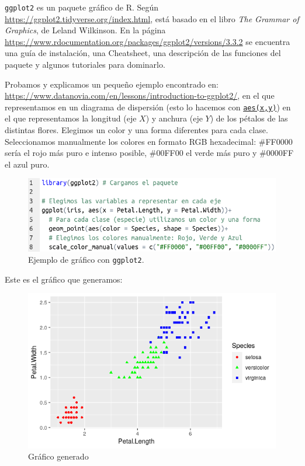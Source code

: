 \documentclass[12pt]{article}
\begin{document}
\texttt{ggplot2} es un paquete gráfico de R. Según
\href{https://ggplot2.tidyverse.org/index.html}{https://ggplot2.tidyverse.org/index.html},
está basado en el libro \emph{The Grammar of Graphics}, de Leland
Wilkinson. En la página \\
\href{https://www.rdocumentation.org/packages/ggplot2/versions/3.3.2}{https://www.rdocumentation.org/packages/ggplot2/versions/3.3.2}
se encuentra una guía de instalación, una Cheatsheet, una descripción
de las funciones del paquete y algunos tutoriales para dominarlo.

Probamos y explicamos un pequeño ejemplo encontrado en: \\
\href{https://www.datanovia.com/en/lessons/introduction-to-ggplot2/}{https://www.datanovia.com/en/lessons/introduction-to-ggplot2/},
en el que representamos en un diagrama de dispersión (esto lo hacemos
con
\href{https://www.rdocumentation.org/packages/ggplot2/versions/3.3.2/topics/aes}{\texttt{aes(x,y)}})
en el que representamos la longitud (eje $X$) y anchura (eje $Y$) de
los pétalos de las distintas flores. Elegimos un color y una forma
diferentes para cada clase. Seleccionamos manualmente los colores en
formato RGB hexadecimal: \#FF0000 sería el rojo más puro e intenso
posible, \#00FF00 el verde más puro y \#0000FF el azul puro.

\begin{figure}[H]
  \centering
  \includegraphics[width=120mm]{imgs/ggplot2-code}
  \caption{Ejemplo de gráfico con \texttt{ggplot2}.}
\end{figure}

Este es el gráfico que generamos:

\begin{figure}[H]
  \centering
  \includegraphics[width=120mm]{imgs/ggplot2-iris}
  \caption{Gráfico generado}
\end{figure}
\end{document}
